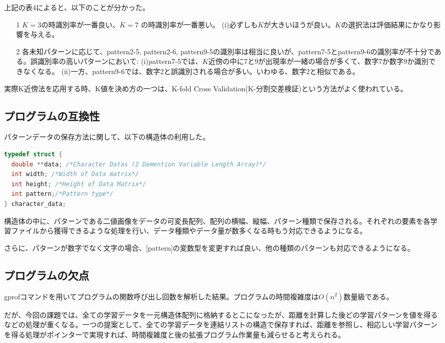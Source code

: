 \documentclass[ %
  uplatex,%
  papersize%
]{jsarticle}
\begin{document}
上記の表4によると、以下のことが分かった。
\begin{itemize}
\item[1] $K=3$の時識別率が一番良い、$K=7$ の時識別率が一番悪い。
\subitem(i)\small  必ずしも$K$が大きいほうが良い。$K$の選択法は評価結果にかなり影響を与える。
\item[2] \normalsize 各未知パターンに応じて、pattern2-5, pattern2-6, pattern9-5の識別率は相当に良いが、pattern7-5とpattern9-6の識別率が不十分である。誤識別率の高いパターンにおいて:
\subitem(i)\small  pattern7-5では、$K$近傍の中に7と9が出現率が一緒の場合が多くて、数字7か数字9か識別できなくなる。
\subitem(ii)\small 一方、pattern9-6では、数字2と誤識別される場合が多い。いわゆる、数字2と相似である。

\end{itemize}
実際K近傍法を応用する時、K値を決め方の一つは、K-fold Cross Validation(K-分割交差検証)という方法がよく使われている\cite{K-fold Cross Validation}。
\subsection{プログラムの互換性}
パターンデータの保存方法に関して、以下の構造体の利用した。
\begin{lstlisting}[language=c]
typedef struct {
  double **data; /*Character Datas (2 Demention Variable Length Array)*/
  int width; /*Width of Data matrix*/
  int height; /*Height of Data Matrix*/
  int pattern;/*Pattern type*/
} character_data;
\end{lstlisting}

構造体の中に、パターンである二値画像をデータの可変長配列、配列の横幅、縦幅、パターン種類で保存される。それぞれの要素を各学習ファイルから獲得できるような処理を行い、データ種類やデータ量が数多くなる時もう対応できるようになる。

さらに、パターンが数字でなく文字の場合、[pattern]の変数型を変更すれば良い、他の種類のパターンも対応できるようになる。
\subsection{プログラムの欠点}
gprofコマンドを用いてプログラムの関数呼び出し回数を解析した結果。プログラムの時間複雑度は$O(n^{2})$数量級である。

だが、今回の課題では、全ての学習データを一元構造体配列に格納するとこになったが、距離を計算した後どの学習パターンを値を得るなどの処理が重くなる。一つの提案として、全ての学習データを連結リストの構造で保存すれば、距離を参照し、相応しい学習パターンを得る処理がポインターで実現すれば、時間複雑度と後の拡張プログラム作業量も減らせると考えられる。
\end{document}
